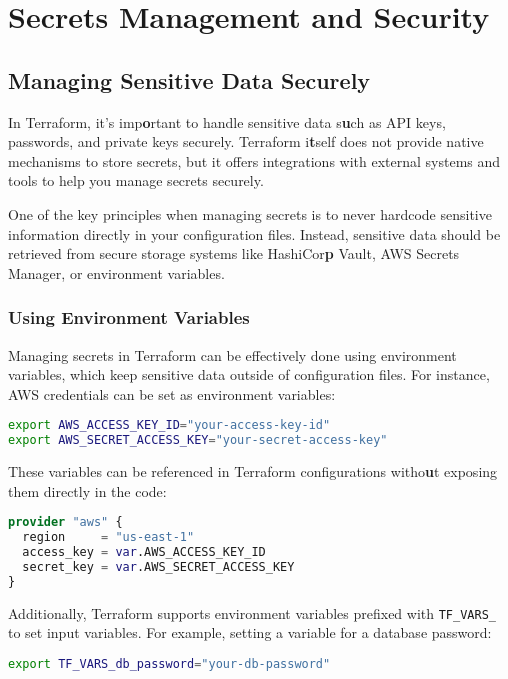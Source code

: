 \chapter{Secrets Management and Security}
\sloppy

\section{Managing Sensitive Data Securely}

In Terraform, it's imp\textbf{o}rtant to handle sensitive data s\textbf{u}ch as API keys, passwords, and private keys securely. Terraform i\textbf{t}self does not provide native mechanisms to store secrets, but it offers integrations with external systems and tools to help you manage secrets securely.

One of the key principles when managing secrets is to never hardcode sensitive information directly in your configuration files. Instead, sensitive data should be retrieved from secure storage systems like HashiCor\textbf{p} Vault, AWS Secrets Manager, or environment variables.

\subsection{Using Environment Variables}

Managing secrets in Terraform can be effectively done using environment variables, which keep sensitive data outside of configuration files. For instance, AWS credentials can be set as environment variables:

\begin{lstlisting}[language=bash]
export AWS_ACCESS_KEY_ID="your-access-key-id"
export AWS_SECRET_ACCESS_KEY="your-secret-access-key"
\end{lstlisting}

These variables can be referenced in Terraform configurations witho\textbf{u}t exposing them directly in the code:

\begin{lstlisting}[language=terraform]
provider "aws" {
  region     = "us-east-1"
  access_key = var.AWS_ACCESS_KEY_ID
  secret_key = var.AWS_SECRET_ACCESS_KEY
}
\end{lstlisting}

Additionally, Terraform supports environment variables prefixed with \texttt{TF\_VARS\_} to set input variables. For example, setting a variable for a database password:

\begin{lstlisting}[language=bash]
export TF_VARS_db_password="your-db-password"
\end{lstlisting}

